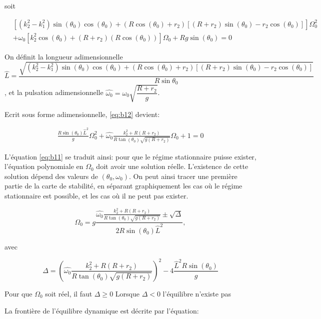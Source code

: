 soit

\begin{align}
     &[(k_2^2-k_1^2)\sin(\theta_0)\cos(\theta_0)+(R \cos(\theta_0)+r_2)[(R+r_2)\sin(\theta_0)-r_2 \cos(\theta_0)]]\Omega_0^2 \nonumber\\
     &+\omega_0[k_2^2 \cos(\theta_0)+(R+r_2)(R \cos(\theta_0))] \Omega_0 + R g \sin(\theta_0) =0
  \label{eq:b12}
\end{align}

On définit la longueur adimensionnelle $$\hat{L}=\dfrac{\sqrt{(k_2^2-k_1^2)\sin(\theta_0)\cos(\theta_0)+(R \cos(\theta_0)+r_2)[(R+r_2)\sin(\theta_0)-r_2 \cos(\theta_0)]}}{R\sin{\theta_0}}$$,
et la pulsation adimensionnelle $\hat{\omega_0}=\omega_0 \sqrt{\dfrac{R+r_2}{g}}$.

Ecrit sous forme adimensionnelle, \ref{eq:b12} devient:

\begin{equation}
 \begin{split}
     \frac{R \sin(\theta_0)\hat{L}^2}{g} \Omega_0^2+\hat{\omega_0} \frac{k_2^2+R(R+r_2)}{R \tan(\theta_0) \sqrt{g(R+r_2)}} \Omega_0+1 =0
 \end{split}
  \label{eq:b12a}
\end{equation}

L'équation \ref{eq:b11} se traduit ainsi: pour que le régime stationnaire puisse exister, l'équation polynomiale en $\Omega_0$ doit avoir une solution réelle. L'existence de cette solution dépend des valeurs de $(\theta_0,\omega_0)$. On peut ainsi tracer une première partie de la carte de stabilité, en séparant graphiquement les cas où le régime stationnaire est possible, et les cas où il ne peut pas exister.

\begin{equation}
 \Omega_0=g \frac{\hat{\omega_0} \frac{k_2^2+R(R+r_2)}{R \tan(\theta_0) \sqrt{g(R+r_2)}}\pm \sqrt{\Delta}}{2R\sin(\theta_0)\hat{L}^2},
  \label{eq:b13}
\end{equation}

avec 

\begin{equation}
 \Delta=(\hat{\omega_0} \frac{k_2^2+R(R+r_2)}{R \tan(\theta_0) \sqrt{g(R+r_2)}})^2-4\frac{ \hat{L}^2 R \sin(\theta_0)}{g}
  \label{eq:b14}
\end{equation}

Pour que $\Omega_0$ soit réel, il faut $\Delta \geq 0$
Lorsque $\Delta < 0$ l'équilibre n'existe pas

La frontière de l'équilibre dynamique est décrite par l'équation:

